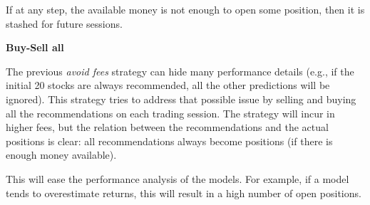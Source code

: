 If at any step, the available money is not enough to open some position, then it is stashed for future sessions.


\textbf{Buy-Sell all}

The previous \textit{avoid fees} strategy can hide many performance details (e.g., if the initial 20 stocks are always recommended, all the other predictions will be ignored). This strategy tries to address that possible issue by selling and buying all the recommendations on each trading session. The strategy will incur in higher fees, but the relation between the recommendations and the actual positions is clear: all recommendations always become positions (if there is enough money available).

This will ease the performance analysis of the models. For example, if a model tends to overestimate returns, this will result in a high number of open positions. 

